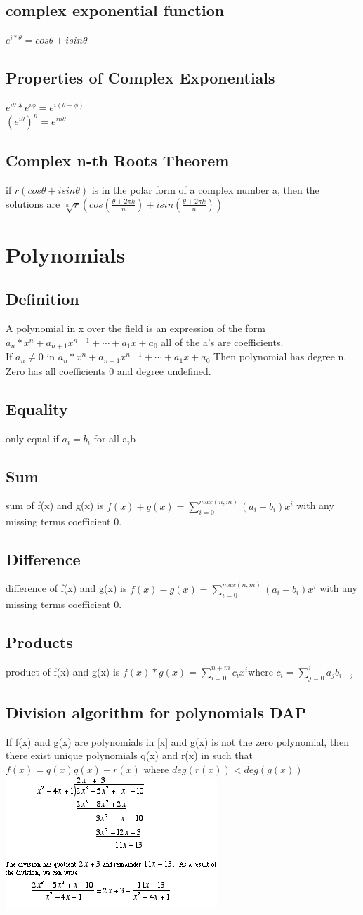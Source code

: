 \documentclass[12pt]{article}
\begin{document}
\subsection{complex exponential function}
$e^{i*\theta}= cos\theta+isin\theta$
\subsection{Properties of Complex Exponentials}
$e^{i\theta}*e^{i\phi}=e^{i(\theta+\phi)}$\\
$(e^{i\theta})^n=e^{in\theta}$
\subsection{Complex n-th Roots Theorem}
if $r(cos\theta + isin\theta)$ is in the polar form of a complex number a, then
the solutions are $\sqrt[n]{r}(cos(\frac{\theta + 2\pi
  k}{n})+isin(\frac{\theta+2\pi k}{n}))$
\section{Polynomials}
\subsection{Definition}
A polynomial in x over the field  is an expression of the form
$a_n*x^n + a_{n+1}x^{n-1} + \cdots +a_1x+a_0$ all of the a's are
coefficients.\\
If $a_n\neq0$ in $a_n*x^n + a_{n+1}x^{n-1} + \cdots +a_1x+a_0$ Then  polynomial
has degree n. Zero has all coefficients 0 and degree undefined.
\subsection{Equality}
only equal if $a_i=b_i$ for all a,b
\subsection{Sum}
sum of f(x) and g(x) is $f(x)+g(x)=\sum_{i=0}^{max(n,m)}(a_i+b_i)x^i$ with any
missing terms coefficient 0.
\subsection{Difference}
difference of f(x) and g(x) is $f(x)-g(x)=\sum_{i=0}^{max(n,m)}(a_i-b_i)x^i$ with any
missing terms coefficient 0.
\subsection{Products}
product of f(x) and g(x) is $f(x)*g(x)=\sum_{i=0}^{n+m}c_ix^i$where
$c_i=\sum_{j=0}^{i} a_jb_{i-j}$
\subsection{Division algorithm for polynomials DAP}
If f(x) and g(x) are polynomials in [x] and g(x) is not the zero
polynomial, then there exist unique polynomials q(x) and r(x) in 
such that $f(x)=q(x)g(x) +r(x)$ where $deg(r(x))<deg(g(x))$
\includegraphics{p95.gif}
\end{document}
